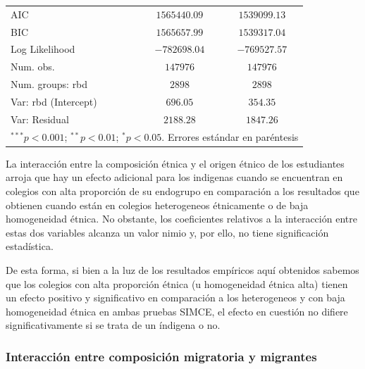 \documentclass[
]{article}
\begin{document}
\begin{table}
\begin{center}
\begin{tabular}{l c c}
AIC                                 & $1565440.09$   & $1539099.13$   \\
BIC                                 & $1565657.99$   & $1539317.04$   \\
Log Likelihood                      & $-782698.04$   & $-769527.57$   \\
Num. obs.                           & $147976$       & $147976$       \\
Num. groups: rbd                    & $2898$         & $2898$         \\
Var: rbd (Intercept)                & $696.05$       & $354.35$       \\
Var: Residual                       & $2188.28$      & $1847.26$      \\
\hline
\multicolumn{3}{l}{\scriptsize{$^{***}p<0.001$; $^{**}p<0.01$; $^{*}p<0.05$. Errores estándar en paréntesis}}
\end{tabular}
\label{table:coefficients}
\end{center}
\end{table}

La interacción entre la composición étnica y el origen étnico de los
estudiantes arroja que hay un efecto adicional para los indigenas cuando
se encuentran en colegios con alta proporción de su endogrupo en
comparación a los resultados que obtienen cuando están en colegios
heterogeneos étnicamente o de baja homogeneidad étnica. No obstante, los
coeficientes relativos a la interacción entre estas dos variables
alcanza un valor nimio y, por ello, no tiene significación estadística.

De esta forma, si bien a la luz de los resultados empíricos aquí
obtenidos sabemos que los colegios con alta proporción étnica (u
homogeneidad étnica alta) tienen un efecto positivo y significativo en
comparación a los heterogeneos y con baja homogeneidad étnica en ambas
pruebas SIMCE, el efecto en cuestión no difiere significativamente si se
trata de un índigena o no.

\hypertarget{interacciuxf3n-entre-composiciuxf3n-migratoria-y-migrantes}{%
\subsubsection{Interacción entre composición migratoria y
migrantes}\label{interacciuxf3n-entre-composiciuxf3n-migratoria-y-migrantes}}
\end{document}
